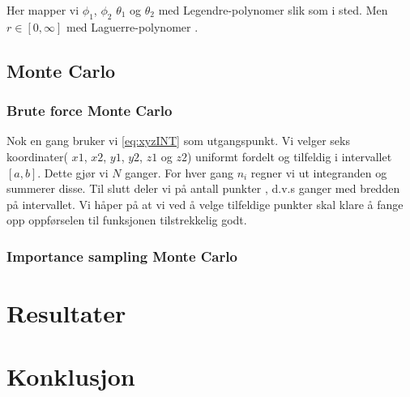 \documentclass[11pt]{article}
\begin{document}
Her mapper vi $\phi_1$, $\phi_2$ $\theta_1$ og $\theta_2$ med Legendre-polynomer slik som i sted.
Men $ r \in [0, \infty] $ med Laguerre-polynomer \cite{Lecture-notes}.


\subsection{Monte Carlo}
\subsubsection{Brute force Monte Carlo}
Nok en gang bruker vi \eqref{eq:xyzINT} som utgangspunkt. Vi velger seks koordinater( $x1$, $x2$, $y1$, $y2$, $z1$ og $z2$) uniformt fordelt og tilfeldig i intervallet $[a,b]$. Dette gjør vi $N$ ganger.
For hver gang $n_i$ regner vi ut integranden og summerer disse. Til slutt deler vi på antall punkter
, d.v.s ganger med bredden på intervallet. Vi håper på at vi ved å velge tilfeldige punkter
skal klare å fange opp oppførselen til funksjonen tilstrekkelig godt.
\subsubsection{Importance sampling Monte Carlo}

\section{Resultater}

\section{Konklusjon}



\printbibliography
\end{document}
